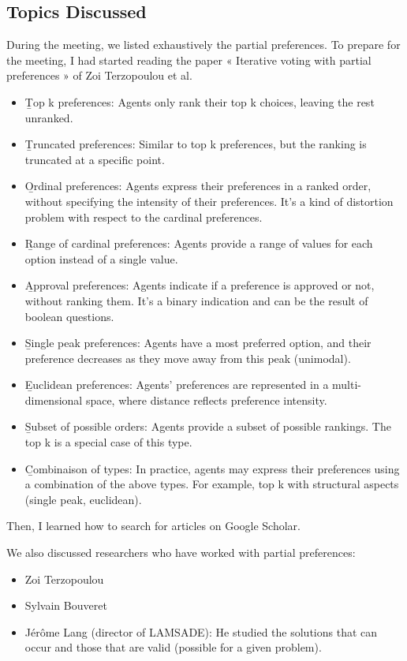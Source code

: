 \documentclass{article}
\begin{document}
\subsection{Topics Discussed}

During the meeting, we listed exhaustively the partial preferences. To prepare for the meeting, I had started reading the paper « Iterative voting with partial preferences » of Zoi Terzopoulou et al. 
\begin{itemize}
    \item \b{Top k preferences:} Agents only rank their top k choices, leaving the rest unranked.
    \item \b{Truncated preferences:} Similar to top k preferences, but the ranking is truncated at a specific point.
    \item \b{Ordinal preferences:} Agents express their preferences in a ranked order, without specifying the intensity of their preferences. It's a kind of distortion problem with respect to the cardinal preferences.
    \item \b{Range of cardinal preferences:} Agents provide a range of values for each option instead of a single value.
    \item \b{Approval preferences:} Agents indicate if a preference is approved or not, without ranking them. It's a binary indication and can be the result of boolean questions.
    \item \b{Single peak preferences:} Agents have a most preferred option, and their preference decreases as they move away from this peak (unimodal).
    \item \b{Euclidean preferences:} Agents' preferences are represented in a multi-dimensional space, where distance reflects preference intensity.
    \item \b{Subset of possible orders:} Agents provide a subset of possible rankings. The top k is a special case of this type.
    \item \b{Combinaison of types:} In practice, agents may express their preferences using a combination of the above types. For example, top k with structural aspects (single peak, euclidean).
\end{itemize}

Then, I learned how to search for articles on Google Scholar.

We also discussed researchers who have worked with partial preferences:

\begin{itemize}
    \item Zoi Terzopoulou
    \item Sylvain Bouveret
    \item Jérôme Lang (director of LAMSADE): He studied the solutions that can occur and those that are valid (possible for a given problem).
\end{itemize}
\end{document}
